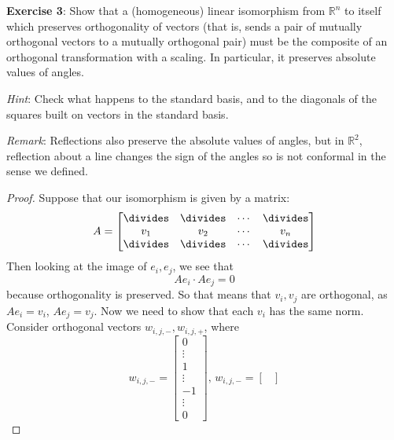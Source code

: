 \documentclass{article}
\begin{document}
\newpage

\textbf{Exercise 3}: Show that a (homogeneous) linear isomorphism from $\mathbb{R}^{n}$ to itself which preserves orthogonality of vectors (that is, sends a pair of mutually orthogonal vectors to a mutually orthogonal pair) must be the composite of an orthogonal transformation with a scaling. In particular, it preserves absolute values of angles.

\textit{Hint}: Check what happens to the standard basis, and to the diagonals of the squares built on vectors in the standard basis.

\textit{Remark}: Reflections also preserve the absolute values of angles, but in $\mathbb{R}^{2}$, reflection about a line changes the sign of the angles so is not conformal in the sense we defined.
    \begin{proof}
        Suppose that our isomorphism is given by a matrix:
            \begin{equation*}
                A = \begin{bmatrix}
                    \divides & \divides & \cdots & \divides \\
                    v_{1}    & v_{2}    & \cdots & v_{n}    \\
                    \divides & \divides & \cdots & \divides   
                \end{bmatrix}
            \end{equation*}
        Then looking at the image of $e_{i}, e_{j}$, we see that 
            \begin{equation*}
                Ae_{i} \cdot Ae_{j} = 0
            \end{equation*}
        because orthogonality is preserved. So that means that $v_{i}, v_{j}$ are orthogonal, as $Ae_{i} = v_{i}$, $Ae_{j} = v_{j}$. Now we need to show that each $v_{i}$ has the same norm. Consider orthogonal vectors $w_{i, j, -}, w_{i, j, +}$, where 
            \begin{equation*}
                w_{i, j, -} = \begin{bmatrix}
                    0      \\
                    \vdots \\
                    1      \\
                    \vdots \\
                    -1     \\
                    \vdots \\
                    0        
                \end{bmatrix}, \, w_{i, j, -} = \begin{bmatrix}

\end{bmatrix}
\end{equation*}
\end{proof}
\end{document}
